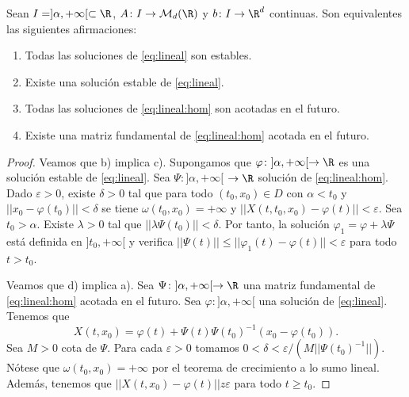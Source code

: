 \begin{proposition}
  Sean $I = ]\alpha, +\infty[ \subset \R$, $A \colon I \to \mathcal{M}_{d}(\R)$ y
  $b \colon I \to \R^d$ continuas. Son equivalentes las siguientes afirmaciones:
  \begin{enumerate}
  \item Todas las soluciones de \eqref{eq:lineal} son estables.
  \item Existe una solución estable de \eqref{eq:lineal}.
  \item Todas las soluciones de \eqref{eq:lineal:hom} son acotadas en el futuro.
  \item Existe una matriz fundamental de \eqref{eq:lineal:hom} acotada en el futuro.
  \end{enumerate}
\end{proposition}
\begin{proof}
  Veamos que b) implica c). Supongamos que $\varphi\colon ]\alpha, +\infty[ \to \R$ es una solución
  estable de \eqref{eq:lineal}. Sea $\Psi \colon ]\alpha, +\infty[$ $\to \R$ solución de
  \eqref{eq:lineal:hom}. Dado $\varepsilon > 0$, existe $\delta > 0$ tal que para todo
  $(t_0, x_0) \in D$ con $\alpha < t_0$ y $||x_0 - \varphi(t_0)|| < \delta$ se tiene
  $\omega(t_0, x_0) = +\infty$ y $||X(t, t_0, x_0) - \varphi(t)|| < \varepsilon$. Sea
  $t_0 > \alpha$. Existe $\lambda > 0$ tal que $||\lambda \Psi(t_0)|| < \delta$. Por tanto, la
  solución $\varphi_1 = \varphi + \lambda \Psi$ está definida en $]t_0,+\infty[$ y verifica
  $||\Psi(t)||\le ||\varphi_1(t) - \varphi(t)|| < \varepsilon$ para todo $t > t_0$.

  Veamos que d) implica a). Sea $\Psi \colon ]\alpha, +\infty[ \to \R$ una matriz fundamental de
  \eqref{eq:lineal:hom} acotada en el futuro. Sea $\varphi \colon ]\alpha, +\infty[$ una solución de
  \eqref{eq:lineal}. Tenemos que
  \[ X(t, x_0) = \varphi(t) + \Psi(t) \Psi(t_0)^{-1} (x_0 - \varphi(t_0)). \] Sea $M > 0$ cota de
  $\Psi$. Para cada $\varepsilon > 0$ tomamos $0 < \delta < \varepsilon / (M
  ||\Psi(t_0)^{-1}||)$. Nótese que $\omega(t_0, x_0) = +\infty$ por el teorema de crecimiento a lo
  sumo lineal. Además, tenemos que $||X(t,x_0) - \varphi(t)|| z \varepsilon$ para todo $t \ge t_0$.
\end{proof}

